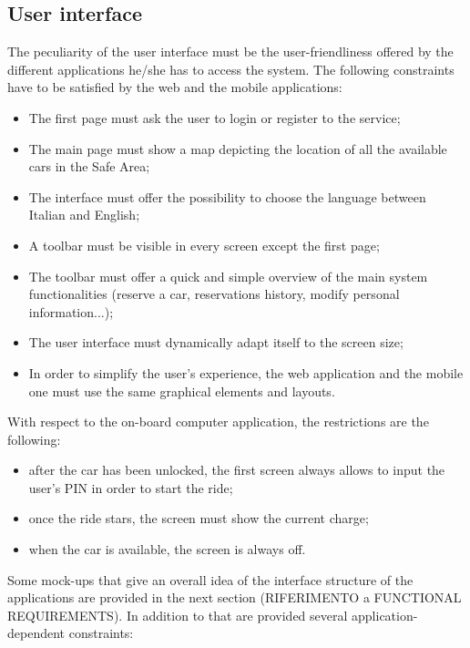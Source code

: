 \subsection{User interface}
The peculiarity of the user interface must be the user-friendliness offered by the different applications he/she has to access the system. The following constraints have to be satisfied by the web and the mobile applications:
\begin{itemize}
\item The first page must ask the user to login or register to the service;
\item The main page must show a map depicting the location of all the available cars in the Safe Area;
\item The interface must offer the possibility to choose the language between Italian and English;
\item A toolbar must be visible in every screen except the first page;
\item The toolbar must offer a quick and simple overview of the main system functionalities (reserve a car, reservations history, modify personal information...);
\item The user interface must dynamically adapt itself to the screen size;
\item In order to simplify the user's experience, the web application and the mobile one must use the same graphical elements and layouts.
\end{itemize}
With respect to the on-board computer application, the restrictions are the following:
\begin{itemize}
\item after the car has been unlocked, the first screen always allows to input the user's PIN in order to start the ride;
\item once the ride stars, the screen must show the current charge;
\item when the car is available, the screen is always off.
\end{itemize}
Some mock-ups that give an overall idea of the interface structure of the applications are provided in the next section (RIFERIMENTO a FUNCTIONAL REQUIREMENTS).
In addition to that are provided several application-dependent constraints:
